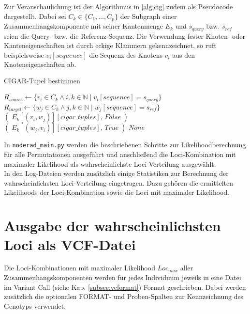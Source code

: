 Zur Veranschaulichung ist der Algorithmus in \ref{alg:cig} zudem als Pseudocode dargestellt. Dabei sei $ C_{k} \in \{C_{1}, \dots ,C_{p}\} $ der Subgraph einer Zusammenhangskomponente mit seiner Kantenmenge $ E_{k} $ und $ s_{query} $ bzw. $ s_{ref} $ seien die Query- bzw. die Referenz-Sequenz. Die Verwendung fester Knoten- oder Kanteneigenschaften ist durch eckige Klammern gekennzeichnet, so ruft beispielsweise $v_{i}[sequence]$ die Sequenz des Knotens $v_{i}$ aus den Knoteneigenschaften ab. \\

\begin{algorithm}[H]
	\caption{CIGAR-Tupel bestimmen}  \label{alg:cig}
	\begin{algorithmic}[1]	
		\State $ R_{source} \gets \{v_{i} \in C_{k} \wedge i,k \in \mathds{N} \; |\; v_{i}[sequence]= s_{query} \}$
		\State $ R_{target} \gets \{w_{j} \in C_{k} \wedge j,k \in \mathds{N} \; |\; w_{j}[sequence]= s_{ref} \}$
		\State \Return $ (\;E_{k}[(v_{i}, w_{j})][cigar\_tuples],\, False\;) $		    
		\EndIf
		\State \Return $ (\;E_{k}[(w_{j}, v_{i})][cigar\_tuples],\, True\;) $		
		\EndIf
		\EndFor
		\EndFor
		\State \Return $ None $
		\EndFunction
	\end{algorithmic}
\end{algorithm}

In \lstinline|noderad_main.py| werden die beschriebenen Schritte zur Likelihoodberechnung für alle Permutationen ausgeführt und anschließend die Loci-Kombination mit maximaler Likelihood als wahrscheinlichste Loci-Verteilung ausgewählt.\\

In den Log-Dateien werden zusätzlich einige Statistiken zur Berechnung der wahrscheinlichsten Loci-Verteilung eingetragen. Dazu gehören die ermittelten Likelihoods der Loci-Kombination sowie die Loci mit maximaler Likelihood. \\

\section{Ausgabe der wahrscheinlichsten Loci als VCF-Datei} \label{sec:vcf}

Die Loci-Kombinationen mit maximaler Likelihood $Loc_{max}$ aller Zusammenhangskomponenten werden für jedes Individuum jeweils in eine Datei im Variant Call (siehe Kap. \ref{subsec:vcformat}) Format geschrieben. Dabei werden zusätzlich die optionalen FORMAT- und Proben-Spalten zur Kennzeichnung des Genotyps verwendet. \\

